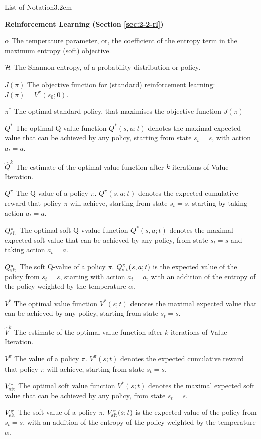 \begin{mclistof}{List of Notation}{3.2cm}
    \item[\Large\textbf{Reinforcement Learning (Section \ref{sec:2-2-rl})}\hfill\hfill]
    \item[$\alpha$] 
        The temperature parameter, or, the coefficient of the entropy term in the maximum entropy (soft) objective.
    \item[$\mathcal{H}$]
        The Shannon entropy, of a probability distribution or policy.
    \item[$J(\pi)$] 
        The objective function for (standard) reinforcement learning: $J(\pi) = V^{\pi}(s_0;0)$.
    \item[$\pi^*$]
        The optimal standard policy, that maximises the objective function $J(\pi)$
    \item[$Q^*$]
        The optimal Q-value function $Q^*(s,a;t)$ denotes the maximal expected value that can be achieved by any policy, starting from state $s_t=s$, with action $a_t=a$.
    \item[$\hat{Q}^k$]
        The estimate of the optimal value function after $k$ iterations of Value Iteration.
    \item[$Q^{\pi}$]
        The Q-value of a policy $\pi$. $Q^{\pi}(s,a;t)$ denotes the expected cumulative reward that policy $\pi$ will achieve, starting from state $s_t=s$, starting by taking action $a_t=a$.
    \item[$Q_{{\textnormal{sft}}}^*$]
        The optimal soft Q-vvalue function $Q^*(s,a;t)$ denotes the maximal expected soft value that can be achieved by any policy, from state $s_t=s$ and taking action $a_t=a$. 
    \item[$Q_{{\textnormal{sft}}}^{\pi}$]
        The soft Q-value of a policy $\pi$. $Q_{{\textnormal{sft}}}^{\pi}(s,a;t)$ is the expected value of the policy from $s_t=s$, starting with action $a_t=a$, with an addition of the entropy of the policy weighted by the temperature $\alpha$.
    \item[$V^*$]
        The optimal value function $V^*(s;t)$ denotes the maximal expected value that can be achieved by any policy, starting from state $s_t=s$.
    \item[$\hat{V}^k$]
        The estimate of the optimal value function after $k$ iterations of Value Iteration.
    \item[$V^{\pi}$]
        The value of a policy $\pi$. $V^{\pi}(s;t)$ denotes the expected cumulative reward that policy $\pi$ will achieve, starting from state $s_t=s$.
    \item[$V_{{\textnormal{sft}}}^*$]
        The optimal soft value function $V^*(s;t)$ denotes the maximal expected soft value that can be achieved by any policy, from state $s_t=s$. 
    \item[$V_{{\textnormal{sft}}}^{\pi}$]
        The soft value of a policy $\pi$. $V_{{\textnormal{sft}}}^{\pi}(s;t)$ is the expected value of the policy from $s_t=s$, with an addition of the entropy of the policy weighted by the temperature $\alpha$.



\end{mclistof}
